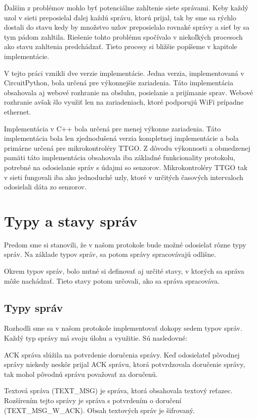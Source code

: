 \documentclass[slovak,master]{diploma}
\begin{document}
Ďalším z problémov mohlo byť potenciálne zahltenie siete správami. Keby každý uzol v sieti preposielal ďalej každú správu, ktorú prijal, tak by sme sa rýchlo dostali 
do stavu kedy by množstvo uzlov preposielalo rovnaké správy a sieť by sa tym pádom zahltila.
Riešenie tohto problému spočívalo v niekoľkých procesoch ako stavu zahltenia predchádzať. Tieto procesy si bližšie popíšeme v kapitole implementácie.

V tejto práci vznikli dve verzie implementácie. Jedna verzia, implementovaná v CircuitPython, bola určená pre výkonnejšie zariadenia. Táto implementácia obsahovala aj webové rozhranie na 
obsluhu, posielanie a prijímanie sprav. Webové rozhranie avšak šlo využiť len na zariadeniach, ktoré podporujú WiFi prípadne ethernet.

Implementácia v C++ bola určená pre menej výkonne zariadenia. Táto implementácia bola len zjednodušená verzia kompletnej implementácie a 
bola primárne určená pre mikrokontroléry TTGO. Z dôvodu výkonnosti a obmedzenej pamäti táto implementácia obsahovala iba základné funkcionality protokolu, potrebné na odosielanie správ s 
údajmi so senzorov. Mikrokontroléry TTGO tak v sieti fungovali iba ako jednoduché uzly, ktoré v určitých časových intervaloch odosielali dáta zo senzorov.

\section{Typy a stavy správ}
Predom sme si stanovili, že v našom protokole bude možné odosielať rôzne typy správ. Na základe typov správ, sa potom správy spracovávajú odlišne.

Okrem typov správ, bolo nutné si definovať aj určité stavy, v ktorých sa správa môže nachádzať. Tieto stavy potom určovali, ako sa správa spracováva.
\subsection{Typy správ}
Rozhodli sme sa v našom protokole implementovať dokopy sedem typov správ. Každý typ správy má svoju úlohu a využitie.
Sú nasledovné:

ACK správa slúžila na potvrdenie doručenia správy. Keď odosielateľ pôvodnej správy niekedy neskôr prijal ACK správu, ktorá 
potvrdzovala doručenie správy, tak mohol pôvodnú správu považovať za doručenú.

Textová správa (TEXT\_MSG) je správa, ktorá obsahovala textový reťazec. Rozšírením tejto správy je správa s potvrdením o doručení (TEXT\_MSG\_W\_ACK).
Obsah textových správ je šifrovaný.
\end{document}
